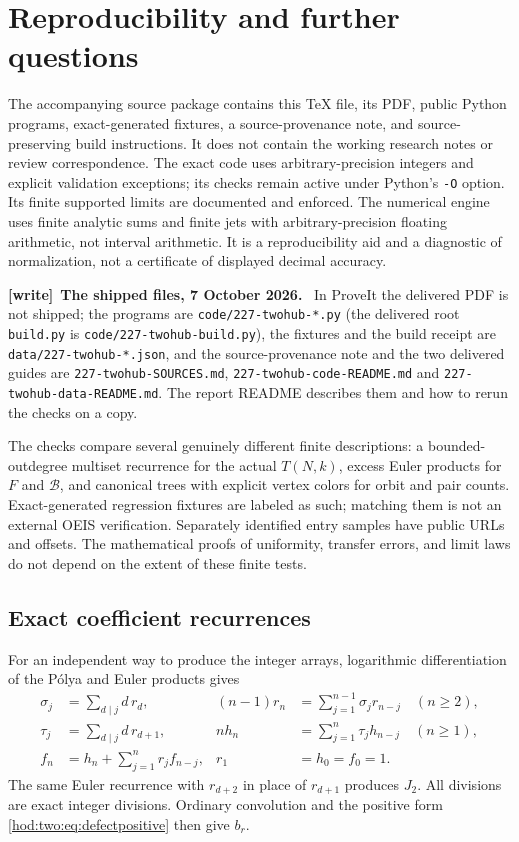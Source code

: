 \documentclass[11pt,letterpaper]{article}
\theoremstyle{definition}\newtheorem{definition}[theorem]{Definition}
\theoremstyle{remark}\newtheorem{remark}[theorem]{Remark}
\newcommand{\Bcal}{\mathcal B}
\newcommand{\file}[1]{\nolinkurl{#1}}
\newenvironment{writenote}[1][]{\par\smallskip\begingroup\small
 \noindent\textbf{[write]}\if\relax\detokenize{#1}\relax\else~\textbf{#1.}\fi\ }%
 {\par\endgroup\smallskip}
\begin{document}
\section{Reproducibility and further questions}\label{hod:two:sec:repro}
The accompanying source package contains this \TeX{} file, its PDF, public Python programs, exact-generated fixtures, a source-provenance note, and source-preserving build instructions. It does not contain the working research notes or review correspondence. The exact code uses arbitrary-precision integers and explicit validation exceptions; its checks remain active under Python's \texttt{-O} option. Its finite supported limits are documented and enforced. The numerical engine uses finite analytic sums and finite jets with arbitrary-precision floating arithmetic, not interval arithmetic. It is a reproducibility aid and a diagnostic of normalization, not a certificate of displayed decimal accuracy.
\begin{writenote}[The shipped files, 7 October 2026]
In ProveIt the delivered PDF is not shipped; the programs are
\file{code/227-twohub-*.py} (the delivered root \file{build.py} is
\file{code/227-twohub-build.py}), the fixtures and the build receipt are
\file{data/227-twohub-*.json}, and the source-provenance note and the two
delivered guides are \file{227-twohub-SOURCES.md},
\file{227-twohub-code-README.md} and \file{227-twohub-data-README.md}. The
report README describes them and how to rerun the checks on a copy.
\end{writenote}

The checks compare several genuinely different finite descriptions: a bounded-outdegree multiset recurrence for the actual $T(N,k)$, excess Euler products for $F$ and $\Bcal$, and canonical trees with explicit vertex colors for orbit and pair counts. Exact-generated regression fixtures are labeled as such; matching them is not an external OEIS verification. Separately identified entry samples have public URLs and offsets. The mathematical proofs of uniformity, transfer errors, and limit laws do not depend on the extent of these finite tests.

\subsection{Exact coefficient recurrences}
For an independent way to produce the integer arrays, logarithmic differentiation of the P\'olya and Euler products gives
\begin{align*}
\sigma_j&=\sum_{d\mid j}d\,r_d,&
(n-1)r_n&=\sum_{j=1}^{n-1}\sigma_jr_{n-j}\quad(n\ge2),\\
\tau_j&=\sum_{d\mid j}d\,r_{d+1},&
nh_n&=\sum_{j=1}^n\tau_jh_{n-j}\quad(n\ge1),\\
f_n&=h_n+\sum_{j=1}^nr_jf_{n-j},&
r_1&=h_0=f_0=1.
\end{align*}
The same Euler recurrence with $r_{d+2}$ in place of $r_{d+1}$ produces $J_2$. All divisions are exact integer divisions. Ordinary convolution and the positive form \eqref{hod:two:eq:defectpositive} then give $b_r$.
\end{document}
